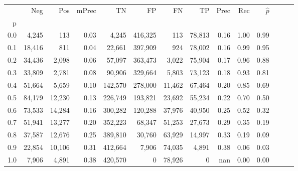 \begin{tabular}{rrrrrrrrrrrrrr}
\toprule
{} &     Neg &     Pos & mPrec &       TN &       FP &      FN &      TP &  Prec &   Rec & $\hat{p}$ \\
p   &         &         &       &          &          &         &         &       &       &           \\
\midrule
0.0 &   4,245 &     113 &  0.03 &    4,245 &  416,325 &     113 &  78,813 &  0.16 &  1.00 &      0.99 \\
0.1 &  18,416 &     811 &  0.04 &   22,661 &  397,909 &     924 &  78,002 &  0.16 &  0.99 &      0.95 \\
0.2 &  34,436 &   2,098 &  0.06 &   57,097 &  363,473 &   3,022 &  75,904 &  0.17 &  0.96 &      0.88 \\
0.3 &  33,809 &   2,781 &  0.08 &   90,906 &  329,664 &   5,803 &  73,123 &  0.18 &  0.93 &      0.81 \\
0.4 &  51,664 &   5,659 &  0.10 &  142,570 &  278,000 &  11,462 &  67,464 &  0.20 &  0.85 &      0.69 \\
0.5 &  84,179 &  12,230 &  0.13 &  226,749 &  193,821 &  23,692 &  55,234 &  0.22 &  0.70 &      0.50 \\
0.6 &  73,533 &  14,284 &  0.16 &  300,282 &  120,288 &  37,976 &  40,950 &  0.25 &  0.52 &      0.32 \\
0.7 &  51,941 &  13,277 &  0.20 &  352,223 &   68,347 &  51,253 &  27,673 &  0.29 &  0.35 &      0.19 \\
0.8 &  37,587 &  12,676 &  0.25 &  389,810 &   30,760 &  63,929 &  14,997 &  0.33 &  0.19 &      0.09 \\
0.9 &  22,854 &  10,106 &  0.31 &  412,664 &    7,906 &  74,035 &   4,891 &  0.38 &  0.06 &      0.03 \\
1.0 &   7,906 &   4,891 &  0.38 &  420,570 &        0 &  78,926 &       0 &   nan &  0.00 &      0.00 \\
\bottomrule
\end{tabular}
